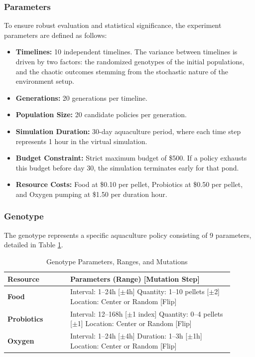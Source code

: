 \documentclass[conference]{IEEEtran}
\begin{document}
\subsubsection{Parameters}
To ensure robust evaluation and statistical significance, the experiment parameters are defined as follows:
\begin{itemize}
    \item \textbf{Timelines:} 10 independent timelines. The variance between timelines is driven by two factors: the randomized genotypes of the initial populations, and the chaotic outcomes stemming from the stochastic nature of the environment setup.
    \item \textbf{Generations:} 20 generations per timeline.
    \item \textbf{Population Size:} 20 candidate policies per generation.
    \item \textbf{Simulation Duration:} 30-day aquaculture period, where each time step represents 1 hour in the virtual simulation.
    \item \textbf{Budget Constraint:} Strict maximum budget of \$500. If a policy exhausts this budget before day 30, the simulation terminates early for that pond.
    \item \textbf{Resource Costs:} Food at \$0.10 per pellet, Probiotics at \$0.50 per pellet, and Oxygen pumping at \$1.50 per duration hour.
\end{itemize}

\subsubsection{Genotype}
The genotype represents a specific aquaculture policy consisting of 9 parameters, detailed in Table \ref{tab:genotype}.

\begin{table}[htbp]
\centering
\caption{Genotype Parameters, Ranges, and Mutations}
\label{tab:genotype}
\begin{tabular}{|p{0.25\linewidth}|p{0.65\linewidth}|}
\hline
\textbf{Resource} & \textbf{Parameters (Range) [Mutation Step]} \\ \hline
\textbf{Food} & Interval: 1--24h [$\pm$4h] \newline Quantity: 1--10 pellets [$\pm$2] \newline Location: Center or Random [Flip] \\ \hline
\textbf{Probiotics} & Interval: 12--168h [$\pm$1 index] \newline Quantity: 0--4 pellets [$\pm$1] \newline Location: Center or Random [Flip] \\ \hline
\textbf{Oxygen} & Interval: 1--24h [$\pm$4h] \newline Duration: 1--3h [$\pm$1h] \newline Location: Center or Random [Flip] \\ \hline
\end{tabular}
\end{table}
\end{document}
